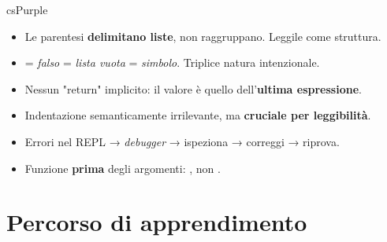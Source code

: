 \begin{introbox}{csPurple}

\small\color{black!70}
\begin{itemize}[leftmargin=1.2em, itemsep=4pt, topsep=0pt]
  \item Le parentesi \textcolor{csPurple!80!black}{\textbf{delimitano liste}}, non raggruppano. Leggile come struttura.
  \item {} = \emph{falso} = \emph{lista vuota} = \emph{simbolo}. Triplice natura intenzionale.
  \item Nessun "return" implicito: il valore è quello dell'\textbf{ultima espressione}.
  \item Indentazione semanticamente irrilevante, ma \textbf{cruciale per leggibilità}.
  \item Errori nel REPL → \emph{debugger} → ispeziona → correggi → riprova.
  \item Funzione \textcolor{csPurple!80!black}{\textbf{prima}} degli argomenti: , non .
\end{itemize}

\end{introbox}

\section*{Percorso di apprendimento}

